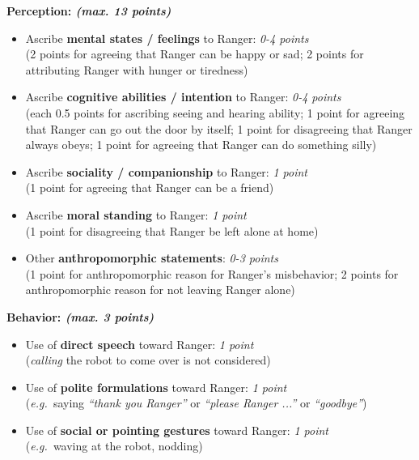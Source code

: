 \documentclass{sig-alternate}
\newcommand{\eg}{{\textit{e.g.~}}}
\begin{document}
\textbf{Perception: \textit{(max. 13 points)}}
\begin{itemize}
	\item Ascribe \textbf{mental states / feelings} to Ranger: \textit{0-4 points}\\
	(2 points for agreeing that Ranger can be happy or sad; 2 points for attributing Ranger with hunger or tiredness)
	\item Ascribe \textbf{cognitive abilities / intention} to Ranger: \textit{0-4 points}\\ 
	(each 0.5 points for ascribing seeing and hearing ability; 1 point for agreeing that Ranger can go out the door by itself; 1 point for disagreeing that Ranger always obeys; 1 point for agreeing that Ranger can do something silly)
	\item Ascribe \textbf{sociality / companionship} to Ranger: \textit{1 point}\\ 
	(1 point for agreeing that Ranger can be a friend)
	\item Ascribe \textbf{moral standing} to Ranger: \textit{1 point}\\ (1 point for disagreeing that Ranger be left alone at home)
	\item Other \textbf{anthropomorphic statements}: \textit{0-3 points}\\ 
	(1 point for anthropomorphic reason for Ranger's misbehavior; 2 points for anthropomorphic reason for not leaving Ranger alone) 
\end{itemize}

\textbf{Behavior: \textit{(max. 3 points)}}
\begin{itemize}
	\item Use of \textbf{direct speech} toward Ranger: \textit{1 point}\\
	(\textit{calling} the robot to come over is not considered)
	\item Use of \textbf{polite formulations} toward Ranger: \textit{1 point}\\ 
	(\eg saying \textit{``thank you Ranger''} or \textit{``please Ranger ...''} or \textit{``goodbye''})
	\item Use of \textbf{social or pointing gestures} toward Ranger: \textit{1 point}\\ 
	(\eg waving at the robot, nodding)
\end{itemize}
	
\end{document}
